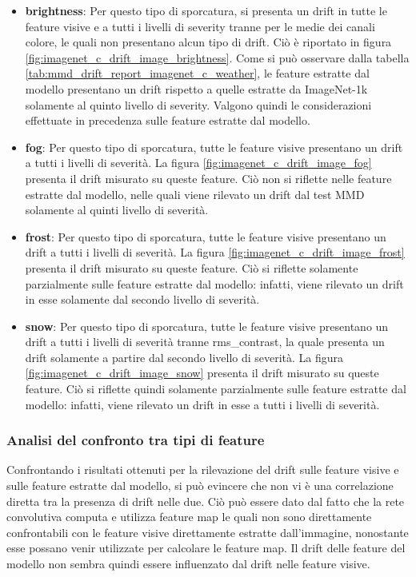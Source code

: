 \begin{itemize}
  \item \textbf{brightness}: Per questo tipo di sporcatura, si presenta un drift in tutte le feature visive e a tutti i livelli di severity tranne per le medie dei canali colore, le quali non presentano alcun tipo di drift. Ciò è riportato in figura \ref{fig:imagenet_c_drift_image_brightness}. Come si può osservare dalla tabella \ref{tab:mmd_drift_report_imagenet_c_weather}, le feature estratte dal modello presentano un drift rispetto a quelle estratte da ImageNet-1k solamente al quinto livello di severity. Valgono quindi le considerazioni effettuate in precedenza sulle feature estratte dal modello.
  \item \textbf{fog}: Per questo tipo di sporcatura, tutte le feature visive presentano un drift a tutti i livelli di severità. La figura \ref{fig:imagenet_c_drift_image_fog} presenta il drift misurato su queste feature. Ciò non si riflette nelle feature estratte dal modello, nelle quali viene rilevato un drift dal test MMD solamente al quinti livello di severità.
  \item \textbf{frost}: Per questo tipo di sporcatura, tutte le feature visive presentano un drift a tutti i livelli di severità. La figura \ref{fig:imagenet_c_drift_image_frost} presenta il drift misurato su queste feature. Ciò si riflette solamente parzialmente sulle feature estratte dal modello: infatti, viene rilevato un drift in esse solamente dal secondo livello di severità.
  \item \textbf{snow}: Per questo tipo di sporcatura, tutte le feature visive presentano un drift a tutti i livelli di severità tranne rms\_contrast, la quale presenta un drift solamente a partire dal secondo livello di severità. La figura \ref{fig:imagenet_c_drift_image_snow} presenta il drift misurato su queste feature. Ciò si riflette quindi solamente parzialmente sulle feature estratte dal modello: infatti, viene rilevato un drift in esse a tutti i livelli di severità.
\end{itemize}
\subsubsection{Analisi del confronto tra tipi di feature}
Confrontando i risultati ottenuti per la rilevazione del drift sulle feature visive e sulle feature estratte dal modello, si può evincere che non vi è una correlazione diretta tra la presenza di drift nelle due. Ciò può essere dato dal fatto che la rete convolutiva computa e utilizza feature map le quali non sono direttamente confrontabili con le feature visive direttamente estratte dall'immagine, nonostante esse possano venir utilizzate per calcolare le feature map. Il drift delle feature del modello non sembra quindi essere influenzato dal drift nelle feature visive.
